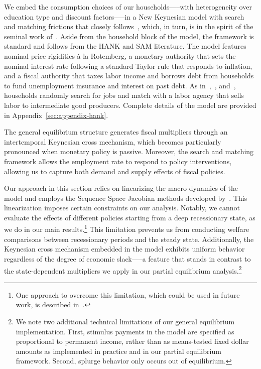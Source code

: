 \documentclass[qe,draft]{econsocart}
\theoremstyle{plain}
\theoremstyle{definition}
\begin{document}
We embed the consumption choices of our households—--with heterogeneity over education type and discount factors—--in a New Keynesian model with search and matching frictions that closely follows~\cite{Du2025}, which, in turn, is in the spirit of the seminal work of~\cite{Ravn2017,Ravn2021}. Aside from the household block of the model, the framework is standard and follows from the HANK and SAM literature. The model features nominal price rigidities \`{a} la Rotemberg, a monetary authority that sets the nominal interest rate following a standard Taylor rule that responds to inflation, and a fiscal authority that taxes labor income and borrows debt from households to fund unemployment insurance and interest on past debt. As in~\cite{Gornemann2021},~\cite{Bardoczy2021}, and~\cite{gravesUnemployment}, households randomly search for jobs and match with a labor agency that sells labor to intermediate good producers. Complete details of the model are provided in Appendix~\ref{sec:appendix-hank}.

The general equilibrium structure generates fiscal multipliers through an intertemporal Keynesian cross mechanism, which becomes particularly pronounced when monetary policy is passive. Moreover, the search and matching framework allows the employment rate to respond to policy interventions, allowing us to capture both demand and supply effects of fiscal policies.

Our approach in this section relies on linearizing the macro dynamics of the model and employs the Sequence Space Jacobian methods developed by~\cite{Auclert2021}. This linearization imposes certain constraints on our analysis. Notably, we cannot evaluate the effects of different policies starting from a deep recessionary state, as we do in our main results.\footnote{One approach to overcome this limitation, which could be used in future work, is described in~\cite{bkmMitShocks}.} This limitation prevents us from conducting welfare comparisons between recessionary periods and the steady state. Additionally, the Keynesian cross mechanism embedded in the model exhibits uniform behavior regardless of the degree of economic slack—--a feature that stands in contrast to the state-dependent multipliers we apply in our partial equilibrium analysis.\footnote{We note two additional technical limitations of our general equilibrium implementation. First, stimulus payments in the model are specified as proportional to permanent income, rather than as means-tested fixed dollar amounts as implemented in practice and in our partial equilibrium framework. Second, splurge behavior only occurs out of equilibrium.}
\end{document}
